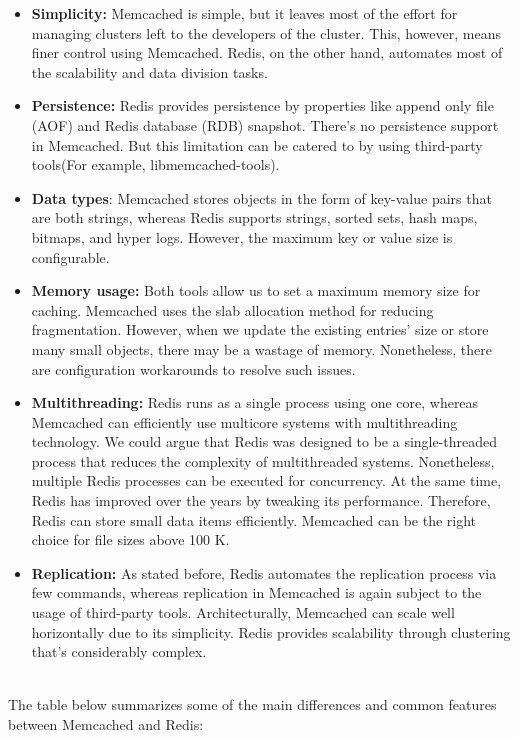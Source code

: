 \begin{itemize}
\item
\protect{}\label{B97bPo8ZN2E-5pMfkIIfY}
\textbf{Simplicity:} Memcached is simple, but it leaves most of the effort for managing clusters left to the developers of the cluster. This, however, means finer control using Memcached. Redis, on the other hand, automates most of the scalability and data division tasks.
\item
\protect{}\label{D2uaHCtz2gCiPNnHBmg_U}
\textbf{Persistence:} Redis provides persistence by properties like append only file (AOF) and Redis database (RDB) snapshot. There's no persistence support in Memcached. But this limitation can be catered to by using third-party tools(For example, libmemcached-tools).
\item
\protect{}\label{c1UNgWr94140SpnebGB3J}
\textbf{Data types}: Memcached stores objects in the form of key-value pairs that are both strings, whereas Redis supports strings, sorted sets, hash maps, bitmaps, and hyper logs. However, the maximum key or value size is configurable.
\item
\protect{}\label{mdt10_h6IbsjO7moqVqNx}
\textbf{Memory usage:} Both tools allow us to set a maximum memory size for caching. Memcached uses the slab allocation method for reducing fragmentation. However, when we update the existing entries' size or store many small objects, there may be a wastage of memory. Nonetheless, there are configuration workarounds to resolve such issues.
\item
\protect{}\label{InWvd2nFrYz4F1Nc1VNrE}
\textbf{Multithreading:} Redis runs as a single process using one core, whereas Memcached can efficiently use multicore systems with multithreading technology. We could argue that Redis was designed to be a single-threaded process that reduces the complexity of multithreaded systems. Nonetheless, multiple Redis processes can be executed for concurrency. At the same time, Redis has improved over the years by tweaking its performance. Therefore, Redis can store small data items efficiently. Memcached can be the right choice for file sizes above 100 K.
\item
\protect{}\label{jBeJI4ILU8dQSdOcdzcjU}
\textbf{Replication:} As stated before, Redis automates the replication process via few commands, whereas replication in Memcached is again subject to the usage of third-party tools. Architecturally, Memcached can scale well horizontally due to its simplicity. Redis provides scalability through clustering that's considerably complex.
\end{itemize}
\\
The table below summarizes some of the main differences and common features between Memcached and Redis:

